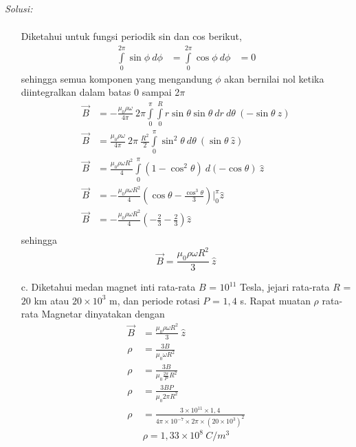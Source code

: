 \documentclass[a4paper, 11pt]{article}
\newenvironment{solution}
    {\textit{Solusi:}}
    {}
\begin{document}
\begin{solution}
\begin{itemize}
\begin{equation*}
\begin{split}
    \end{split}
    \end{equation*}
    Diketahui untuk fungsi periodik sin dan cos berikut,
    \begin{equation*}
    \begin{split}
            \int \limits_{0}^{2\pi} {\sin{\phi} \:d\phi} & = \int \limits_{0}^{2\pi} {\cos{\phi} \:d\phi} & = 0
    \end{split}
    \end{equation*}
    sehingga semua komponen yang mengandung $\phi$ akan bernilai nol ketika diintegralkan dalam  batas 0 sampai 2$\pi$
    \begin{equation*}
    \begin{split}
        \vec{B} & = -\frac{\mu_{0} \rho \omega}{4\pi} \:2\pi \int \limits_{0}^{\pi} \int \limits_{0}^{R} {r\sin{\theta} \sin{\theta} \:dr \:d\theta} \:(- \sin{\theta} \:\hat{z})\\
        \vec{B} & = \frac{\mu_{0} \rho \omega}{4\pi} \:2\pi \:\frac{R^{2}}{2} \int \limits_{0}^{\pi} {\sin^2{\theta} \:d\theta} \:(\sin{\theta} \:\hat{z})\\
        \vec{B} & = \frac{\mu_{0} \rho \omega R^{2}}{4} \int \limits_{0}^{\pi} {(1-\cos^2\theta) \:d(-\cos\theta)}  \:\hat{z}\\
        \vec{B} & = -\frac{\mu_{0} \rho \omega R^{2}}{4} \left(\cos\theta - \frac{\cos^3\theta}{3}\right) \Bigr|_{0}^{\pi} \hat{z}\\
        \vec{B} & = -\frac{\mu_{0} \rho \omega R^{2}}{4} \left(-\frac{2}{3}-\frac{2}{3}\right) \hat{z}\\
    \end{split}
    \end{equation*}
    sehingga
    \begin{equation*}
        \boxed{\vec{B} = \frac{\mu_{0} \rho \omega R^{2}}{3} \:\hat{z}}
    \end{equation*}
    \item[c.] Diketahui medan magnet inti rata-rata  $B$ = $10^{11}$ Tesla, jejari rata-rata $R$ = $20$ km atau $20 \times 10^{3}$ m, dan periode rotasi $P$ = $1,4$ s. Rapat muatan $\rho$ rata-rata Magnetar dinyatakan dengan
    \begin{equation*}
    \begin{split}
        \vec{B} & = \frac{\mu_{0} \rho \omega R^{2}}{3} \:\hat{z}\\
        \rho & = \frac{3B}{\mu_{0} \omega R^{2}}\\
        \rho & = \frac{3B}{\mu_{0} \frac{2\pi}{P} R^{2}}\\
        \rho & = \frac{3BP}{\mu_{0} 2\pi R^{2}}\\
        \rho & = \frac{3\times 10^{11} \times 1,4}{4\pi \times 10^{-7} \times 2\pi \times (20\times 10^{3})^{2}}
    \end{split}
    \end{equation*}
    \begin{equation*}
        \boxed{\rho =1,33\times10^{8} \:{C/m^3}}
    \end{equation*}
\end{itemize}
\end{solution} 
\end{document}
